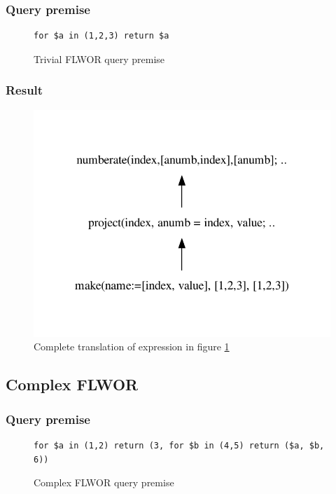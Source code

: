 \subsubsection{Query premise}
\begin{figure}[!htp]
\begin{center}
\begin{Verbatim}
for $a in (1,2,3) return $a
\end{Verbatim}
  \caption{Trivial FLWOR query premise}
  \label{fig:results:query_trivial_flwor}
\end{center}
\end{figure}

\subsubsection{Result}
\begin{figure}[!htp]
\begin{center}
  \includegraphics[width=1.0\textwidth]{img/graphs/td_impl_flwor_simple_xq_relalg} \caption{Complete translation of expression in figure
  \ref{fig:results:query_trivial_flwor}}
  \label{fig:results:query_trivial_flwor_result}
\end{center}
\end{figure}

\subsection{Complex FLWOR}
\label{sect:results:algebra:generated:complex_flwor}
\subsubsection{Query premise}
\begin{figure}[!htp]
\begin{center}
\begin{Verbatim}
for $a in (1,2) return (3, for $b in (4,5) return ($a, $b, 6))
\end{Verbatim}
  \caption{Complex FLWOR query premise}
  \label{fig:results:query_complex_flwor}
\end{center}
\end{figure}

